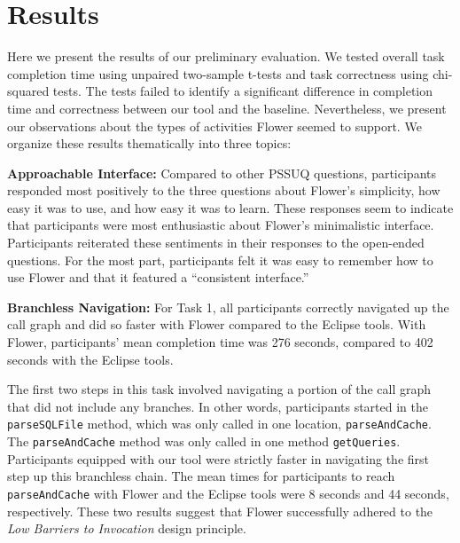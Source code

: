 \documentclass[conference]{IEEEtran}
\begin{document}
\section{Results}
Here we present the results of our preliminary evaluation. 
We tested overall task completion time using unpaired two-sample t-tests and task correctness using chi-squared tests. 
The tests failed to identify a significant difference in completion time and correctness between our tool and the baseline. 
Nevertheless, we present our observations about the types of activities Flower  seemed to support.
We organize these results thematically into three topics:


\textbf{Approachable Interface:}
Compared to other PSSUQ questions, participants responded most positively to the three questions about Flower's simplicity, how easy it was to use, and how easy it was to learn. 
These responses seem to indicate that participants were most enthusiastic about Flower's minimalistic interface. 
Participants reiterated these sentiments in their responses to the open-ended questions. 
For the most part, participants felt it was easy to remember how to use Flower and that it featured a ``consistent interface.''

\textbf{Branchless Navigation:}
For Task 1, all participants correctly navigated up the call graph and did so faster with Flower  compared to the Eclipse tools.
With Flower, participants' mean completion time was 276 seconds, compared to 402 seconds with the Eclipse tools.

The first two steps in this task involved navigating a portion of the call graph that did not include any branches.
In other words, participants started in the \texttt{parseSQLFile} method, which was only called in one location, \texttt{parseAndCache}. 
The \texttt{parseAndCache} method was only called in one method \texttt{getQueries}.
Participants equipped with our tool were strictly faster in navigating the first step up this branchless chain. 
The mean times for participants to reach \texttt{parseAndCache} with Flower and the Eclipse tools were 8 seconds and 44 seconds, respectively.
These two results suggest that Flower successfully adhered to the \textit{Low Barriers to Invocation} design principle. 
\end{document}
